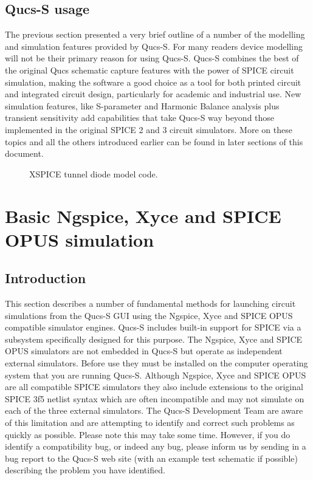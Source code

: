 \section{Qucs-S usage}
The previous section presented a very brief outline of a number of the modelling and simulation features provided by Qucs-S.  For many readers device modelling will not be their primary reason for using Qucs-S. Qucs-S combines the best of the original Qucs schematic capture features with the power of SPICE circuit simulation, making the software a good choice as a tool for both printed circuit and integrated circuit design, particularly for academic and industrial use.  New simulation features, like S-parameter and Harmonic Balance analysis plus transient sensitivity add capabilities that take Qucs-S way beyond those implemented in the original SPICE 2 and 3 circuit simulators.  More on these topics and all the others introduced earlier can be found in later sections of this document.
\begin{figure}[ht]
	\centering
	\caption{XSPICE tunnel diode model code.}
	\label{FigCH1-7}
\end{figure}

\newpage
\chapter{Basic Ngspice, Xyce and SPICE OPUS simulation}
\section{Introduction}
This section describes a number of fundamental methods for launching circuit simulations from the Qucs-S GUI  using
the Ngspice, Xyce and SPICE OPUS compatible simulator engines. Qucs-S includes built-in support for SPICE via a  subsystem specifically designed for this purpose. The Ngspice, Xyce and SPICE OPUS simulators are not embedded in Qucs-S but operate as independent external simulators. Before use they must be installed on the computer operating system that you are running Qucs-S. Although Ngspice, Xyce and SPICE OPUS are all compatible SPICE simulators they also include extensions to the original SPICE 3f5 netlist syntax which are often incompatible and may not simulate on each of the three external simulators.  The Qucs-S Development Team are aware of this limitation and are attempting  to identify and correct such problems as quickly as possible.  Please note this may take some time.  However, if you do identify a compatibility bug, or indeed any bug, please inform us by sending in a bug report to the Qucs-S web site (with an example test schematic if possible) describing the problem you have identified.
